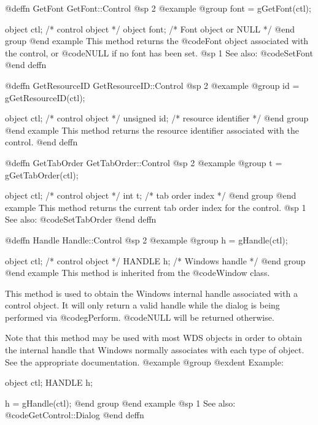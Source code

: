 @deffn {GetFont} GetFont::Control
@sp 2
@example
@group
font = gGetFont(ctl);

object  ctl;    /*  control object  */
object  font;   /*  Font object or NULL  */
@end group
@end example
This method returns the @code{Font} object associated with the control,
or @code{NULL} if no font has been set.
@sp 1
See also:  @code{SetFont}
@end deffn



@deffn {GetResourceID} GetResourceID::Control
@sp 2
@example
@group
id = gGetResourceID(ctl);

object    ctl;   /*  control object    */
unsigned  id;    /*  resource identifier  */
@end group
@end example
This method returns the resource identifier associated with the control.
@end deffn



@deffn {GetTabOrder} GetTabOrder::Control
@sp 2
@example
@group
t = gGetTabOrder(ctl);

object  ctl;   /*  control object    */
int     t;     /*  tab order index   */
@end group
@end example
This method returns the current tab order index for the control.
@sp 1
See also:  @code{SetTabOrder}
@end deffn











@deffn {Handle} Handle::Control
@sp 2
@example
@group
h = gHandle(ctl);

object  ctl;    /*  control object   */
HANDLE  h;      /*  Windows handle  */
@end group
@end example
This method is inherited from the @code{Window} class.

This method is used to obtain the Windows internal handle associated with
a control object.  It will only return a valid handle while the dialog
is being performed via @code{gPerform}.  @code{NULL} will be returned
otherwise.

Note that this method may be used with most WDS objects in order to obtain
the internal handle that Windows normally associates with each type of object.
See the appropriate documentation.
@example
@group
@exdent Example:

object  ctl;
HANDLE  h;

h = gHandle(ctl);
@end group
@end example
@sp 1
See also:  @code{GetControl::Dialog}
@end deffn











